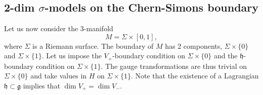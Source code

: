 \documentclass[a4paper]{amsart}
\theoremstyle{plain}
\theoremstyle{definition}
\newcommand{\g}{\mathfrak{g}}
\newcommand{\h}{\mathfrak{h}}
\newcommand{\la}{\langle}
\newcommand{\ra}{\rangle}
\begin{document}





\subsection{2-dim $\sigma$-models on the Chern-Simons boundary}

Let us now consider the 3-manifold 
$$M=\Sigma\times [0,1],$$
where $\Sigma$ is a Riemann surface.
The boundary of $M$ has 2 components, $\Sigma\times\{0\}$ and $\Sigma\times\{1\}$.
Let us impose the $V_+$-boundary condition on $\Sigma\times\{0\}$ and the $\h$-boundary condition on $\Sigma\times\{1\}$. The gauge transformations are thus trivial on $\Sigma\times\{0\}$ and take values in $H$ on $\Sigma\times\{1\}$. 
Note that the existence of a Lagrangian $\h\subset\g$ implies that $\dim V_+=\dim V_-$.
\end{document}
